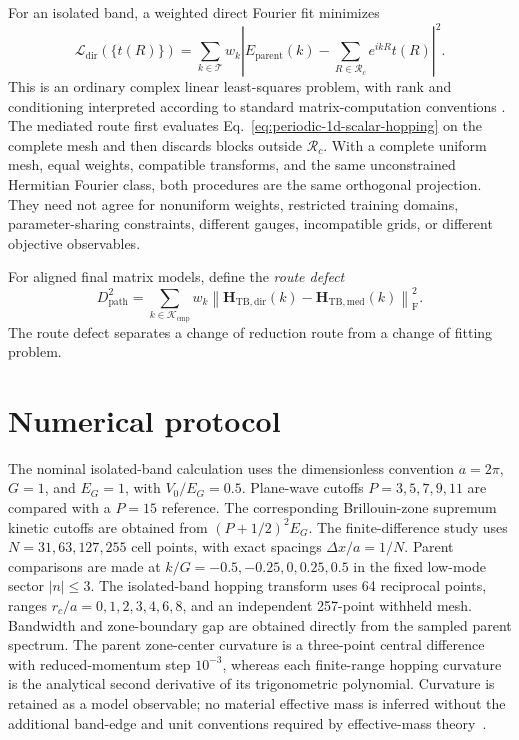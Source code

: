 For an isolated band, a weighted direct Fourier fit minimizes
\begin{equation}
    \mathcal L_{\mathrm{dir}}(\{t(R)\})
    =
    \sum_{k\in\mathcal T}w_k
    \left|
        E_{\mathrm{parent}}(k)
        -\sum_{R\in\mathcal R_c}e^{ikR}t(R)
    \right|^2.
    \label{eq:periodic-1d-direct-objective}
\end{equation}
This is an ordinary complex linear least-squares problem, with rank and conditioning
interpreted according to standard matrix-computation conventions
\cite{golubVanLoan2013}. The mediated route first evaluates
Eq.~\eqref{eq:periodic-1d-scalar-hopping} on
the complete mesh and then discards blocks outside $\mathcal R_c$. With a
complete uniform mesh, equal weights, compatible transforms, and the same
unconstrained Hermitian Fourier class, both procedures are the same orthogonal
projection. They need not agree for nonuniform weights, restricted training
domains, parameter-sharing constraints, different gauges, incompatible grids,
or different objective observables.

For aligned final matrix models, define the \emph{route defect}
\begin{equation}
    D_{\mathrm{path}}^2
    =
    \sum_{k\in\mathcal K_{\mathrm{cmp}}}w_k
    \left\lVert
        \mathbf H_{\mathrm{TB,dir}}(k)
        -\mathbf H_{\mathrm{TB,med}}(k)
    \right\rVert_{\mathrm F}^2.
    \label{eq:periodic-1d-path-defect}
\end{equation}
The route defect separates a change of reduction route from a change of fitting
problem.

\section{Numerical protocol}

The nominal isolated-band calculation uses the dimensionless convention
$a=2\pi$, $G=1$, and $E_G=1$, with $V_0/E_G=0.5$. Plane-wave cutoffs
$P=3,5,7,9,11$ are compared with a $P=15$ reference. The corresponding
Brillouin-zone supremum kinetic cutoffs are obtained from
$(P+1/2)^2E_G$. The finite-difference study uses $N=31,63,127,255$ cell points,
with exact spacings $\Delta x/a=1/N$. Parent comparisons are made at
$k/G=-0.5,-0.25,0,0.25,0.5$ in the fixed low-mode sector $|n|\leq3$.
The isolated-band hopping transform uses 64 reciprocal points, ranges
$r_c/a=0,1,2,3,4,6,8$, and an independent 257-point withheld mesh. Bandwidth and
zone-boundary gap are obtained directly from the sampled parent spectrum. The parent
zone-center curvature is a three-point central difference with reduced-momentum step
$10^{-3}$, whereas each finite-range hopping curvature is the analytical second
derivative of its trigonometric polynomial. Curvature is retained as a model
observable; no material effective mass is inferred without the additional band-edge
and unit conventions required by effective-mass theory~\cite{luttingerKohn1955}.


